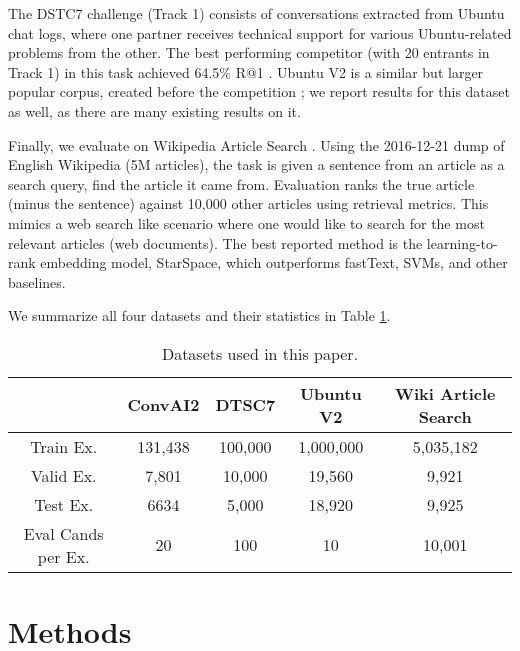 \documentclass{article} \usepackage{iclr2020_conference,times}
\begin{document}
The DSTC7 challenge (Track 1) consists of
 conversations extracted from Ubuntu chat logs, where one partner receives technical support for various Ubuntu-related problems from the other. The best performing competitor (with 20 entrants in Track 1) in this task achieved 64.5\% R@1 \citep{chen_noetic}. 
Ubuntu V2 is a similar but larger popular corpus, created before the competition \citep{lowe2015ubuntu}; we report results for this dataset as well, as there are many existing results on it. 


Finally, we evaluate on Wikipedia Article Search \citep{wu2018starspace}. Using the 2016-12-21 dump of English Wikipedia (5M articles),  the task is given a sentence from an  article as a search query, find the article it came
from. Evaluation ranks the true article (minus the sentence) against 10,000 other  articles using retrieval metrics. This mimics a web search like scenario where one would like to search for the most relevant articles (web documents). The best reported method is the learning-to-rank embedding model, StarSpace, which outperforms fastText, SVMs, and other baselines.

We summarize all four datasets and their statistics in Table \ref{table:datasets}.





\begin{table}[h]
\center
\begin{small}
\begin{tabular}{|c|cccc|}
\hline
             &  ConvAI2 &  DTSC7 & Ubuntu V2 & Wiki Article Search\\
\hline
Train Ex. & 131,438 & 100,000 &  1,000,000 &  5,035,182\\
Valid Ex. & 7,801&  10,000 & 19,560        &  9,921 \\
Test  Ex. & 6634 & 5,000 &  18,920         &  9,925\\
Eval Cands per Ex. &  20  & 100 &  10      &  10,001\\
\hline
\end{tabular}
\end{small}
\caption{Datasets used in this paper.}
\label{table:datasets}
\vspace{-0.5em}
\end{table}

\section{Methods}
\end{document}
